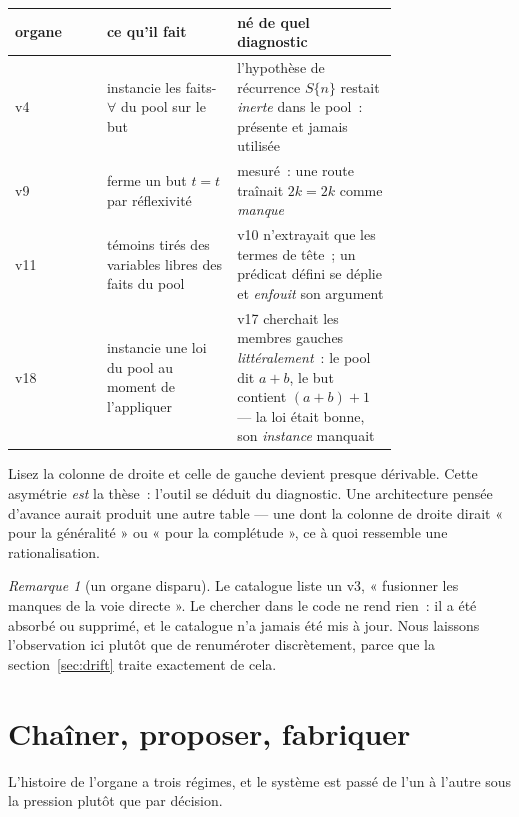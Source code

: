 \documentclass[11pt]{article}
\theoremstyle{remark}\newtheorem{remarque}{Remarque}
\begin{document}
\begin{center}\small
\begin{tabular}{@{}lL{0.34\linewidth}L{0.42\linewidth}@{}}
\toprule
organe & ce qu'il fait & \textbf{né de quel diagnostic} \\
\midrule
v4 & instancie les faits-$\forall$ du pool sur le but
   & l'hypothèse de récurrence $S\{n\}$ restait \emph{inerte} dans le pool~: présente et
     jamais utilisée \\
v9 & ferme un but $t = t$ par réflexivité
   & mesuré~: une route traînait $2k = 2k$ comme \emph{manque} \\
v11 & témoins tirés des variables libres des faits du pool
   & v10 n'extrayait que les termes de tête~; un prédicat défini se déplie et
     \emph{enfouit} son argument \\
v18 & instancie une loi du pool au moment de l'appliquer
   & v17 cherchait les membres gauches \emph{littéralement}~: le pool dit $a+b$, le but
     contient $(a+b)+1$ --- la loi était bonne, son \emph{instance} manquait \\
\bottomrule
\end{tabular}
\end{center}

Lisez la colonne de droite et celle de gauche devient presque dérivable. Cette asymétrie
\emph{est} la thèse~: l'outil se déduit du diagnostic. Une architecture pensée d'avance
aurait produit une autre table --- une dont la colonne de droite dirait « pour la
généralité » ou « pour la complétude », ce à quoi ressemble une rationalisation.

\begin{remarque}[un organe disparu]
Le catalogue liste un v3, « fusionner les manques de la voie directe ». Le chercher dans
le code ne rend rien~: il a été absorbé ou supprimé, et le catalogue n'a jamais été mis à
jour. Nous laissons l'observation ici plutôt que de renuméroter discrètement, parce que
la section~\ref{sec:drift} traite exactement de cela.
\end{remarque}

\section{Chaîner, proposer, fabriquer}
\label{sec:frontier}

L'histoire de l'organe a trois régimes, et le système est passé de l'un à l'autre sous
la pression plutôt que par décision.
\end{document}
